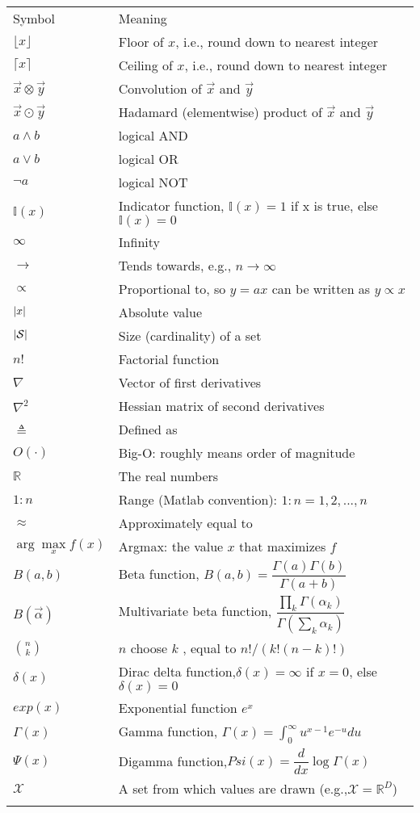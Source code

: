 \begin{longtable}{p{2.4cm}p{8.9cm}}
Symbol & Meaning \\
\noalign{\smallskip}\hline\noalign{\smallskip}
$\lfloor x \rfloor$ & Floor of $x$, i.e., round down to nearest integer\\
$\lceil x \rceil$ & Ceiling of $x$, i.e., round down to nearest integer\\
$\vec{x} \otimes \vec{y}$ & Convolution of $\vec{x}$ and $\vec{y}$\\
$\vec{x} \odot \vec{y}$ & Hadamard (elementwise) product of $\vec{x}$ and $\vec{y}$\\
$a \wedge b$ & logical AND\\
$a \vee b$ & logical OR\\
$\neg a$ & logical NOT\\
$\mathbb{I}(x)$ & Indicator function, $\mathbb{I}(x)=1$ if x is true, else $\mathbb{I}(x)=0$\\
$\infty$ & Infinity\\
$\rightarrow$ & Tends towards, e.g., $n \rightarrow \infty$\\
$\propto$ &Proportional to, so $y = ax$ can be written as $y \propto x$\\
$\left\lvert x\right\rvert$ & Absolute value\\
$\left\lvert\mathcal{S}\right\rvert$ & Size (cardinality) of a set\\
$n!$ & Factorial function\\
$\nabla$ & Vector of first derivatives\\
$\nabla^2$ & Hessian matrix of second derivatives\\
$\triangleq$ & Defined as\\
$O(\cdot)$ & Big-O: roughly means order of magnitude\\
$\mathbb{R}$ & The real numbers\\
$1:n$ & Range (Matlab convention): $1:n = {1, 2,...,n}$\\
$\approx$ & Approximately equal to\\
$\arg\max\limits_x f(x)$ & Argmax: the value $x$ that maximizes $f$\\
$B(a,b)$ & Beta function, $B(a,b)=\dfrac{\Gamma(a)\Gamma(b)}{\Gamma(a+b)}$\\
$B(\vec{\alpha})$ & Multivariate beta function, $\dfrac{\prod\limits_k \Gamma(\alpha_k)}{\Gamma(\sum\limits_k \alpha_k)}$\\
$\binom{n}{k}$ & $n$ choose $k$ , equal to $n!/(k!(n−k )!)$\\
$\delta(x)$ & Dirac delta function,$\delta(x)=\infty$ if $x=0$, else $\delta(x)=0$\\
$exp(x)$ & Exponential function $e^x$\\
$\Gamma(x)$ & Gamma function, $\Gamma(x)=\int_0^\infty u^{x-1}e^{-u}du$\\
$\Psi(x)$ &  Digamma function,$Psi(x)=\dfrac{d}{dx}\log\Gamma(x)$\\
$\mathcal{X}$ & A set from which values are drawn (e.g.,$\mathcal{X}=\mathbb{R}^D$)\\
\noalign{\smallskip}\hline\noalign{\smallskip}
\end{longtable}


